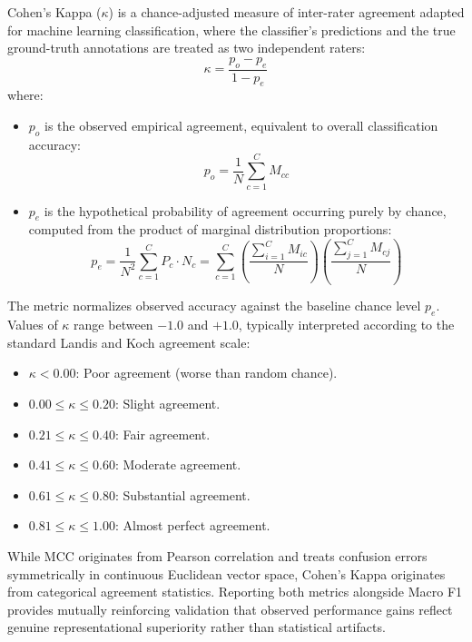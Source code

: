 Cohen's Kappa ($\kappa$) is a chance-adjusted measure of inter-rater agreement adapted for machine learning classification, where the classifier's predictions and the true ground-truth annotations are treated as two independent raters:
\begin{equation}
\label{eq:cohen_kappa}
\kappa = \frac{p_o - p_e}{1 - p_e}
\end{equation}
where:
\begin{itemize}[leftmargin=*]
    \item $p_o$ is the observed empirical agreement, equivalent to overall classification accuracy:
    \begin{equation}
    p_o = \frac{1}{N}\sum_{c=1}^{C} M_{cc}
    \end{equation}
    \item $p_e$ is the hypothetical probability of agreement occurring purely by chance, computed from the product of marginal distribution proportions:
    \begin{equation}
    p_e = \frac{1}{N^2}\sum_{c=1}^{C} P_c \cdot N_c = \sum_{c=1}^{C} \left(\frac{\sum_{i=1}^{C} M_{ic}}{N}\right) \left(\frac{\sum_{j=1}^{C} M_{cj}}{N}\right)
    \end{equation}
\end{itemize}
The metric normalizes observed accuracy against the baseline chance level $p_e$. Values of $\kappa$ range between $-1.0$ and $+1.0$, typically interpreted according to the standard Landis and Koch agreement scale:
\begin{itemize}[leftmargin=*]
    \item $\kappa < 0.00$: Poor agreement (worse than random chance).
    \item $0.00 \le \kappa \le 0.20$: Slight agreement.
    \item $0.21 \le \kappa \le 0.40$: Fair agreement.
    \item $0.41 \le \kappa \le 0.60$: Moderate agreement.
    \item $0.61 \le \kappa \le 0.80$: Substantial agreement.
    \item $0.81 \le \kappa \le 1.00$: Almost perfect agreement.
\end{itemize}
While MCC originates from Pearson correlation and treats confusion errors symmetrically in continuous Euclidean vector space, Cohen's Kappa originates from categorical agreement statistics. Reporting both metrics alongside Macro F1 provides mutually reinforcing validation that observed performance gains reflect genuine representational superiority rather than statistical artifacts.

